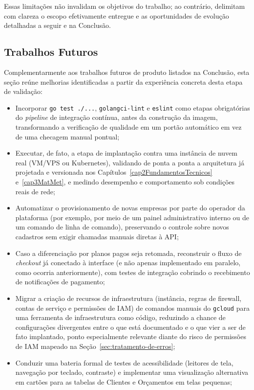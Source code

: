 Essas limitações não invalidam os objetivos do trabalho; ao contrário, delimitam com clareza o escopo efetivamente entregue e as oportunidades de evolução detalhadas a seguir e na Conclusão.

\subsection{Trabalhos Futuros}

Complementarmente aos trabalhos futuros de produto listados na Conclusão, esta seção reúne melhorias identificadas a partir da experiência concreta desta etapa de validação:

\begin{itemize}
  \item Incorporar \texttt{go test ./\allowbreak{}...}, \texttt{golangci-lint} e \texttt{eslint} como etapas obrigatórias do \textit{pipeline} de integração contínua, antes da construção da imagem, transformando a verificação de qualidade em um portão automático em vez de uma checagem manual pontual;
  \item Executar, de fato, a etapa de implantação contra uma instância de nuvem real (VM/VPS ou Kubernetes), validando de ponta a ponta a arquitetura já projetada e versionada nos Capítulos~\ref{cap2FundamentosTecnicos} e~\ref{cap3MatMet}, e medindo desempenho e comportamento sob condições reais de rede;
  \item Automatizar o provisionamento de novas empresas por parte do operador da plataforma (por exemplo, por meio de um painel administrativo interno ou de um comando de linha de comando), preservando o controle sobre novos cadastros sem exigir chamadas manuais diretas à API;
  \item Caso a diferenciação por planos pagos seja retomada, reconstruir o fluxo de \textit{checkout} já conectado à interface (e não apenas implementado em paralelo, como ocorria anteriormente), com testes de integração cobrindo o recebimento de notificações de pagamento;
  \item Migrar a criação de recursos de infraestrutura (instância, regras de firewall, contas de serviço e permissões de IAM) de comandos manuais do \texttt{gcloud} para uma ferramenta de infraestrutura como código, reduzindo a chance de configurações divergentes entre o que está documentado e o que vier a ser de fato implantado, ponto especialmente relevante diante do risco de permissões de IAM mapeado na Seção~\ref{sec:tratamento-de-erros};
  \item Conduzir uma bateria formal de testes de acessibilidade (leitores de tela, navegação por teclado, contraste) e implementar uma visualização alternativa em cartões para as tabelas de Clientes e Orçamentos em telas pequenas;

\end{itemize}
